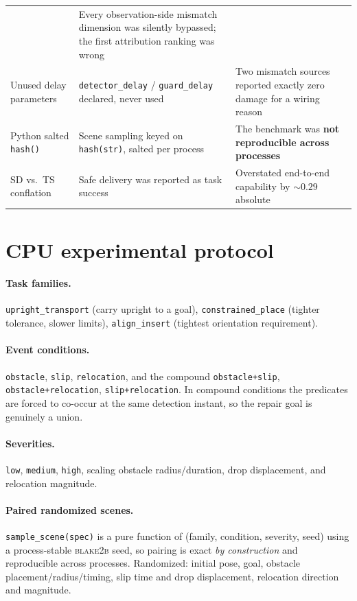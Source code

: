 \documentclass[11pt]{article}
\begin{document}
\begin{center}
\begin{longtable}{p{}p{}p{}}
 & Every observation-side mismatch dimension was silently bypassed; the first
   attribution ranking was wrong \\
Unused delay parameters
 & \texttt{detector\_delay} / \texttt{guard\_delay} declared, never used
 & Two mismatch sources reported exactly zero damage for a wiring reason \\
Python salted \texttt{hash()}
 & Scene sampling keyed on \texttt{hash(str)}, salted per process
 & The benchmark was \textbf{not reproducible across processes} \\
SD vs.\ TS conflation
 & Safe delivery was reported as task success
 & Overstated end-to-end capability by $\sim\!0.29$ absolute \\
\bottomrule
\end{longtable}
\end{center}

\section{CPU experimental protocol}
\label{sec:protocol}

\paragraph{Task families.} \texttt{upright\_transport} (carry upright to a
goal), \texttt{constrained\_place} (tighter tolerance, slower limits),
\texttt{align\_insert} (tightest orientation requirement).

\paragraph{Event conditions.} \texttt{obstacle}, \texttt{slip},
\texttt{relocation}, and the compound \texttt{obstacle+slip},
\texttt{obstacle+relocation}, \texttt{slip+relocation}. In compound conditions
the predicates are forced to co-occur at the same detection instant, so the
repair goal is genuinely a union.

\paragraph{Severities.} \texttt{low}, \texttt{medium}, \texttt{high}, scaling
obstacle radius/duration, drop displacement, and relocation magnitude.

\paragraph{Paired randomized scenes.} \texttt{sample\_scene(spec)} is a pure
function of (family, condition, severity, seed) using a process-stable
\textsc{blake2b} seed, so pairing is exact \emph{by construction} and
reproducible across processes. Randomized: initial pose, goal, obstacle
placement/radius/timing, slip time and drop displacement, relocation direction
and magnitude.
\end{document}
